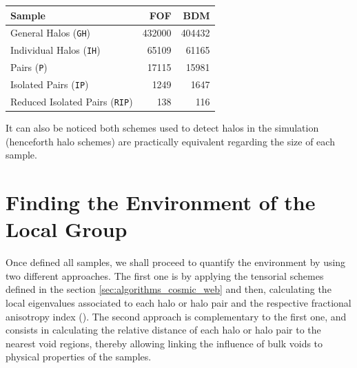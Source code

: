 \documentclass[usenatbib]{latex/mn2e}
\begin{document}
\begin{table}[h]
\begin{flushleft}
\begin{center}
  \begin{tabular}{l  r  r} \hline\hline
	\textbf{Sample}					&\textbf{FOF}&\textbf{BDM} \\ \hline
	General Halos (\texttt{GH}) 	& 432000	 & 404432  \\ 
	Individual Halos (\texttt{IH}) 	& 65109		 & 61165  \\ 
	Pairs (\texttt{P}) 	 			& 17115		 & 15981  \\ 
	Isolated Pairs (\texttt{IP})	& 1249		 & 1647  \\ 
	Reduced Isolated Pairs (\texttt{RIP})& 138	 & 116  \\ \hline\hline
  \end{tabular}  
  
  \label{tab:Samples_Size}
  
\end{center}
\end{flushleft}
\end{table}


It can also be noticed both schemes used to detect halos in the simulation 
(henceforth halo schemes) are practically equivalent regarding the size of 
each sample.


\section{Finding the Environment of the Local Group}
\label{sec:LGEnvironment}



Once defined all samples, we shall proceed to quantify the environment
by using two different approaches. The first one is by applying the 
tensorial schemes defined in the section \ref{sec:algorithms_cosmic_web} 
and then, calculating the local eigenvalues associated to each halo or halo 
pair and the respective fractional anisotropy index (). The second approach is complementary to the first one, and 
consists in calculating the relative distance of each halo or halo pair to 
the nearest void regions, thereby allowing linking the influence of bulk 
voids to physical properties of the samples.
\end{document}
